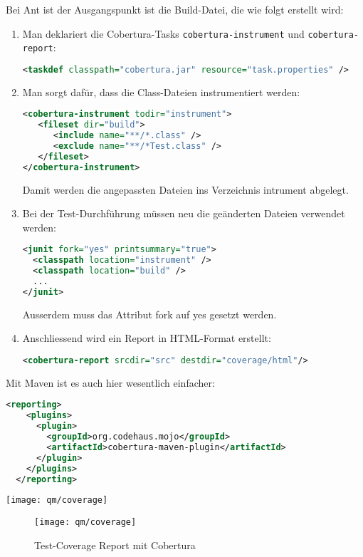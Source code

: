 \newslide
Bei Ant ist der Ausgangspunkt ist die Build-Datei, die wie folgt erstellt wird:
\begin{enumerate}
\item Man deklariert die Cobertura-Tasks \verb+cobertura-instrument+ und
  \verb+cobertura-report+:
  \begin{lstlisting}[language=xml,morekeywords={taskdef}]
<taskdef classpath="cobertura.jar" resource="task.properties" />
  \end{lstlisting}
\newslide
\item Man sorgt dafür, dass die Class-Dateien instrumentiert werden:
  \begin{lstlisting}[language=xml,
    morekeywords={cobertura,instrument,fileset,include,exclude}]
<cobertura-instrument todir="instrument">
   <fileset dir="build">
      <include name="**/*.class" />
      <exclude name="**/*Test.class" />
   </fileset>
</cobertura-instrument>
  \end{lstlisting}
  Damit werden die angepassten Dateien ins Verzeichnis intrument abgelegt.
\newslide
\item Bei der Test-Durchführung müssen neu die geänderten Dateien verwendet
  werden:
  \begin{lstlisting}[language=xml,morekeywords={junit,classpath}]
<junit fork="yes" printsummary="true">
  <classpath location="instrument" />
  <classpath location="build" />
  ...
</junit>
  \end{lstlisting}
  Ausserdem muss das Attribut fork auf yes gesetzt werden.
\newslide
\item Anschliessend wird ein Report in HTML-Format erstellt:
  \begin{lstlisting}[language=xml,morekeywords={cobertura,report}]
<cobertura-report srcdir="src" destdir="coverage/html"/>
  \end{lstlisting}
\end{enumerate}
%
Mit Maven ist es auch hier wesentlich einfacher:
\begin{lstlisting}[language=xml,
  morekeywords={reporting,plugins,plugin,groupId,artifactId}]
  <reporting>
    <plugins>
      <plugin>
        <groupId>org.codehaus.mojo</groupId>
        <artifactId>cobertura-maven-plugin</artifactId>
      </plugin>
    </plugins>
  </reporting>
\end{lstlisting}
\ifslides
  \texttt{[image: qm/coverage]}
\else
\begin{figure}[H]
  \centering
  \texttt{[image: qm/coverage]}
  \caption{Test-Coverage Report mit Cobertura}
  \label{fig:cobertura}
\end{figure}
\fi
\newpage

